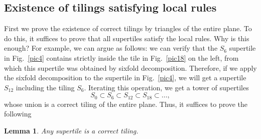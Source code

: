 \documentclass[11pt]{article}
\newtheorem{lemma}{Lemma}
\theoremstyle{remark}
\begin{document}
\subsection{Existence of tilings satisfying local rules}

First we prove the existence of correct tilings by triangles of the entire plane. 
To do this, it suffices to prove that all supertiles satisfy the local rules. 
Why is this enough? For example, we can argue as follows: we can verify that the $S_6$ supertile in 
Fig.~\ref{pic4} contains strictly inside the tile in Fig.~\ref{pic18} on the left, 
from which this supertile was obtained by sixfold decomposition. 
Therefore, if we apply the sixfold decomposition to the supertile in Fig.~\ref{pic4},
we will get a supertile $S_{12}$ including the tiling $S_6$.
Iterating this operation, we get a tower of supertiles 
$$
S_0\subset S_6\subset S_{12}\subset S_{18}\subset\dots, 
$$
whose union is   a correct tiling of the entire plane. 
Thus, it suffices to prove the following
\begin{lemma}
Any supertile is a correct tiling.
\end{lemma}
\end{document}
